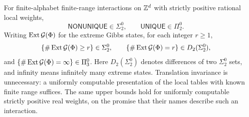 \begin{proposition}\label{prop:phase-arith}
For finite-alphabet finite-range interactions on $\mathbb Z^d$ with strictly positive rational local weights,
\[
 \mathsf{NONUNIQUE}\in\Sigma^0_2,\qquad
 \mathsf{UNIQUE}\in\Pi^0_2.
\]
Writing $\operatorname{Ext}\mathcal G(\Phi)$ for the extreme Gibbs states, for each integer $r\ge1$,
\[
 \{\#\operatorname{Ext}\mathcal G(\Phi)\ge r\}\in\Sigma^0_2,\qquad
 \{\#\operatorname{Ext}\mathcal G(\Phi)=r\}\in D_2(\Sigma^0_2),
\]
and $\{\#\operatorname{Ext}\mathcal G(\Phi)=\infty\}\in\Pi^0_3$.
Here $D_2(\Sigma^0_2)$ denotes differences of two $\Sigma^0_2$ sets, and infinity means infinitely many extreme states. Translation invariance is unnecessary: a uniformly computable presentation of the local tables with known finite range suffices. The same upper bounds hold for uniformly computable strictly positive real weights, on the promise that their names describe such an interaction.
\end{proposition}
